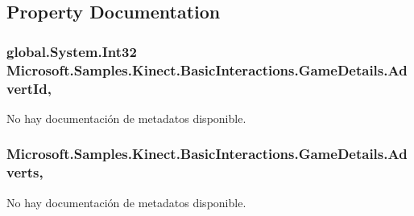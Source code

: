 \subsection{Property Documentation}
\hypertarget{class_microsoft_1_1_samples_1_1_kinect_1_1_basic_interactions_1_1_game_details_abb42070f7298c6c4e6666e949e5e7a01}{
\subsubsection[{Advert\-Id}]{\setlength{\rightskip}{0pt plus 5cm}global.\-System.\-Int32 Microsoft.\-Samples.\-Kinect.\-Basic\-Interactions.\-Game\-Details.\-Advert\-Id\hspace{0.3cm}{\ttfamily [get]}, {\ttfamily [set]}}}\label{class_microsoft_1_1_samples_1_1_kinect_1_1_basic_interactions_1_1_game_details_abb42070f7298c6c4e6666e949e5e7a01}


No hay documentación de metadatos disponible. 

\hypertarget{class_microsoft_1_1_samples_1_1_kinect_1_1_basic_interactions_1_1_game_details_a138e3476c874bbad172268cf13178790}{
\subsubsection[{Adverts}]{ Microsoft.\-Samples.\-Kinect.\-Basic\-Interactions.\-Game\-Details.\-Adverts\hspace{0.3cm}{\ttfamily [get]}, {\ttfamily [set]}}}\label{class_microsoft_1_1_samples_1_1_kinect_1_1_basic_interactions_1_1_game_details_a138e3476c874bbad172268cf13178790}


No hay documentación de metadatos disponible. 

